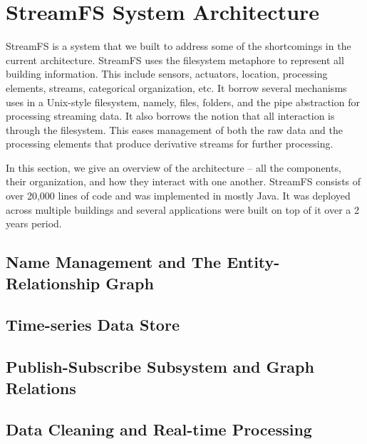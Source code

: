 \chapter{StreamFS System Architecture}
StreamFS is a system that we built to address some of the shortcomings in the current architecture.  StreamFS uses the filesystem
metaphore to represent all building information.  This include sensors, actuators, location, processing elements, 
streams, categorical organization, etc.  It borrow several mechanisms uses in a Unix-style filesystem, namely, files, folders,
and the pipe abstraction for processing streaming data.  It also borrows the notion that all interaction is through the filesystem.
This eases management of both the raw data and the processing elements that produce derivative streams for further processing.

In this section, we give an overview of the architecture -- all the components, their organization, and how they interact with one
another.  StreamFS consists of over 20,000 lines of code and was implemented in mostly Java.  It was deployed across multiple
buildings and several applications were built on top of it over a 2 years period.

\section{Name Management and The Entity-Relationship Graph}


\section{Time-series Data Store}

\section{Publish-Subscribe Subsystem and Graph Relations}

\section{Data Cleaning and Real-time Processing}



